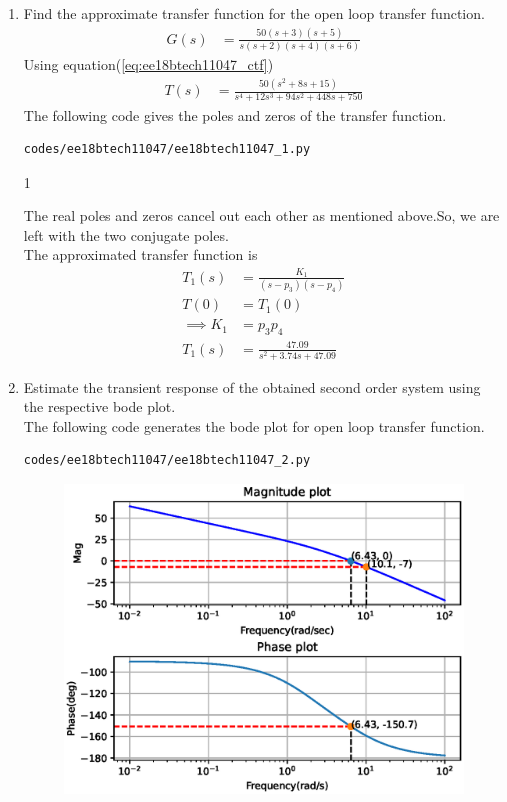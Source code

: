 \begin{enumerate}[label=\thesubsection.\arabic*.,ref=\thesubsection.\theenumi]
\item Find the approximate transfer function for the open loop transfer function.
\begin{align}
G(s) &= \frac{50(s+3)(s+5)}{s(s+2)(s+4)(s+6)}
\end{align}
\solution Using equation(\ref{eq:ee18btech11047_ctf})
\begin{align}
T(s) &= \frac{50(s^{2}+8s+15)}{s^4+12s^3+94s^2+448s+750}
\end{align}
The following code gives the poles and zeros of the transfer function.
\begin{lstlisting}
codes/ee18btech11047/ee18btech11047_1.py
\end{lstlisting}
\begin{table}[!ht]
\centering

\caption{1}
\label{table:ee18btech11047}
\end{table}
The real poles  and zeros  cancel out each other as mentioned above.So, we are left with the two conjugate poles.\\
The approximated transfer function is 
\begin{align}
T_{1}(s) &= \frac{K_{1}}{(s-p_{3})(s-p_{4})}\\ 
T(0) &= T_{1}(0)\\
\implies K_{1} &= p_{3}p_{4}\\
T_{1}(s) &= \frac{47.09}{s^{2}+3.74s+47.09}
\end{align}
\item Estimate the transient response of the obtained second order system using the respective bode plot.\\
\solution The following code generates the bode plot for open loop transfer function.
\begin{lstlisting}
codes/ee18btech11047/ee18btech11047_2.py
\end{lstlisting}
\begin{figure}[!ht]
\centering
\includegraphics[width=\columnwidth]{./figs/ee18btech11047/ee18btech11047_2.eps}

\end{figure}
\end{enumerate}
